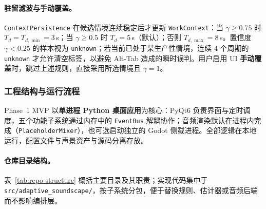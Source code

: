 \documentclass[12pt, fontset=windows]{ctexart}
\begin{document}
\paragraph{驻留滤波与手动覆盖。}\texttt{ContextPersistence} 在候选情境连续稳定后才更新 \texttt{WorkContext}：当 $\gamma\ge 0.75$ 时 $T_d=T_{d,\min}=3$\,s；当 $\gamma\ge 0.5$ 时 $T_d=5$\,s（默认）；否则 $T_{d,\max}=8$\,s。置信度 $\gamma<0.25$ 的样本视为 \texttt{unknown}；若当前已处于某生产性情境，连续 4 个周期的 \texttt{unknown} 才允许清空标签，以避免 Alt-Tab 造成的瞬时误判。用户启用 UI \textbf{手动覆盖}时，跳过上述规则，直接采用所选情境且 $\gamma=1$。

\subsubsection{工程结构与运行流程}

Phase~1 MVP 以\textbf{单进程 Python 桌面应用}为核心：PyQt6 负责界面与定时调度，五个功能子系统通过内存中的 \texttt{EventBus} 解耦协作；音频渲染默认在进程内完成（\texttt{PlaceholderMixer}），也可选启动独立的 Godot 侧载进程。全部逻辑在本地运行，配置文件与声景资产与源码分离存放。

\paragraph{仓库目录结构。}表~\ref{tab:repo-structure} 概括主要目录及其职责；实现代码集中于 \texttt{src/adaptive\_soundscape/}，按子系统分包，便于替换规则、估计器或音频后端而不影响编排层。
\end{document}
